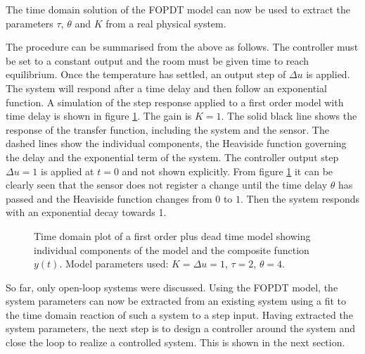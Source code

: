 The time domain solution of the FOPDT model can now be used to extract the parameters $\tau$, $\theta$ and $K$ from a real physical system.

The procedure can be summarised from the above as follows. The controller must be set to a constant output and the room must be given time to reach equilibrium. Once the temperature has settled, an output step of $\Delta u$ is applied. The system will respond after a time delay and then follow an exponential function. A simulation of the step response applied to a first order model with time delay is shown in figure \ref{fig:fopdt}. The gain is $K=1$. The solid black line shows the response of the transfer function, including the system and the sensor. The dashed lines show the individual components, the Heaviside function governing the delay and the exponential term of the system. The controller output step $\Delta u = 1$ is applied at $t=0$ and not shown explicitly. From figure \ref{fig:fopdt} it can be clearly seen that the sensor does not register a change until the time delay $\theta$ has passed and the Heaviside function changes from $0$ to $1$. Then the system responds with an exponential decay towards \num{1}.
\begin{figure}[ht]
    \centering
    \caption{Time domain plot of a first order plus dead time model showing individual components of the model and the composite function $y(t)$. Model parameters used: $K= \Delta u = 1$, $\tau=2$, $\theta=4$.}
    \label{fig:fopdt}
\end{figure}

So far, only open-loop systems were discussed. Using the FOPDT model, the system parameters can now be extracted from an existing system using a fit to the time domain reaction of such a system to a step input. Having extracted the system parameters, the next step is to design a controller around the system and close the loop to realize a controlled system. This is shown in the next section.

